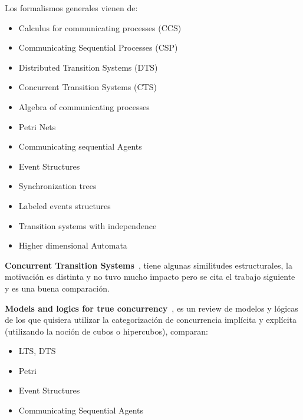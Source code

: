 Los formalismos generales vienen de:
\begin{itemize}
	\item Calculus for communicating processes (CCS) ~\cite{milner1989communication}
	\item Communicating Sequential Processes (CSP) ~\cite{brookes1984theory}
	\item Distributed Transition Systems (DTS) ~\cite{lodaya1995logical,lodaya1992models}
	\item Concurrent Transition Systems (CTS) ~\cite{boudol1988non, degano1987concurrent, stark1989concurrent}
	\item Algebra of communicating processes ~\cite{bergstra1984process}
	\item Petri Nets ~\cite{brauer2006petri}
	\item Communicating sequential Agents ~\cite{lodaya1987modal, lodaya1992temporal}
	\item Event Structures ~\cite{winskel1986event}
	\item Synchronization trees ~\cite{winskel1984synchronization}
	\item Labeled events structures
	\item Transition systems with independence ~\cite{sassone1996models}
	\item Higher dimensional Automata ~\cite{van2006expressiveness}
\end{itemize}

\textbf{Concurrent Transition Systems}~\cite{stark1989concurrent}, tiene algunas similitudes estructurales, la motivación es distinta y no tuvo mucho impacto pero se cita el trabajo siguiente y es una buena comparación.

\textbf{Models and logics for true concurrency}~\cite{lodaya1992models}, es un review de modelos y lógicas de los que quisiera utilizar la categorización de concurrencia implícita y explícita (utilizando la noción de cubos o hipercubos), comparan:
\begin{itemize}
\item LTS, DTS
\item Petri
\item Event Structures
\item Communicating Sequential Agents
\end{itemize}

